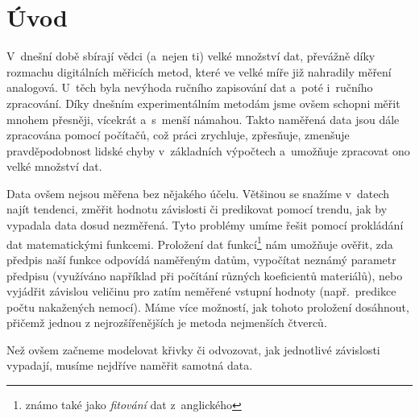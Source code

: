 \section{Úvod}
V~dnešní době sbírají vědci (a~nejen ti) velké množství dat, převážně díky
rozmachu digitálních měřicích metod, které ve velké míře již nahradily měření
analogová. U~těch byla nevýhoda ručního zapisování dat a~poté i~ručního
zpracování. Díky dnešním experimentálním metodám jsme ovšem schopni měřit
mnohem přesněji, vícekrát a~s~menší námahou. Takto naměřená data jsou dále
zpracována pomocí počítačů, což práci zrychluje, zpřesňuje, zmenšuje
pravděpodobnost lidské chyby v~základních výpočtech a~umožňuje zpracovat ono
velké množství dat.

Data ovšem nejsou měřena bez nějakého účelu. Většinou se snažíme v~datech najít
tendenci, změřit hodnotu závislosti či predikovat pomocí trendu, jak by
vypadala data dosud nezměřená. Tyto problémy umíme řešit pomocí prokládání dat
matematickými funkcemi. Proložení dat funkcí\footnote{známo také jako
\emph{fitování} dat z~anglického } nám umožňuje ověřit, zda předpis
naší funkce odpovídá naměřeným datům, vypočítat neznámý parametr předpisu
(využíváno například při počítání různých koeficientů materiálů), nebo
vyjádřit závislou veličinu pro zatím neměřené vstupní hodnoty (např.~predikce
počtu nakažených nemocí). Máme více možností, jak tohoto proložení dosáhnout,
přičemž jednou z nejrozšířenějších je metoda nejmenších čtverců.


Než ovšem začneme modelovat křivky či odvozovat, jak jednotlivé
závislosti vypadají, musíme nejdříve naměřit samotná data. 

